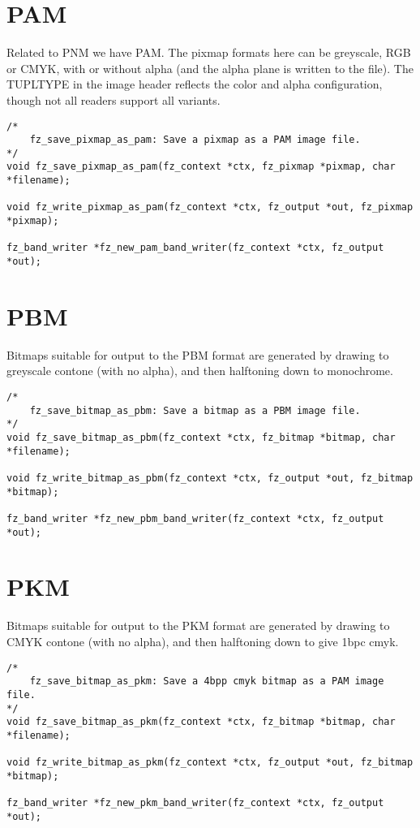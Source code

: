 \documentclass[oneside]{book}
\begin{document}
\section{PAM}

Related to PNM we have PAM. The pixmap formats here can be greyscale, RGB or CMYK, with or without alpha (and the alpha plane is written to the file). The TUPLTYPE in the image header reflects the color and alpha configuration, though not all readers support all variants.

\begin{lstlisting}
/*
	fz_save_pixmap_as_pam: Save a pixmap as a PAM image file.
*/
void fz_save_pixmap_as_pam(fz_context *ctx, fz_pixmap *pixmap, char *filename);

void fz_write_pixmap_as_pam(fz_context *ctx, fz_output *out, fz_pixmap *pixmap);

fz_band_writer *fz_new_pam_band_writer(fz_context *ctx, fz_output *out);
\end{lstlisting}

\section{PBM}

Bitmaps suitable for output to the PBM format are generated by drawing to greyscale contone (with no alpha), and then halftoning down to monochrome. 

\begin{lstlisting}
/*
	fz_save_bitmap_as_pbm: Save a bitmap as a PBM image file.
*/
void fz_save_bitmap_as_pbm(fz_context *ctx, fz_bitmap *bitmap, char *filename);

void fz_write_bitmap_as_pbm(fz_context *ctx, fz_output *out, fz_bitmap *bitmap);

fz_band_writer *fz_new_pbm_band_writer(fz_context *ctx, fz_output *out);
\end{lstlisting}

\section{PKM}

Bitmaps suitable for output to the PKM format are generated by drawing to CMYK contone (with no alpha), and then halftoning down to give 1bpc cmyk.

\begin{lstlisting}
/*
	fz_save_bitmap_as_pkm: Save a 4bpp cmyk bitmap as a PAM image file.
*/
void fz_save_bitmap_as_pkm(fz_context *ctx, fz_bitmap *bitmap, char *filename);

void fz_write_bitmap_as_pkm(fz_context *ctx, fz_output *out, fz_bitmap *bitmap);

fz_band_writer *fz_new_pkm_band_writer(fz_context *ctx, fz_output *out);
\end{lstlisting}
\end{document}
